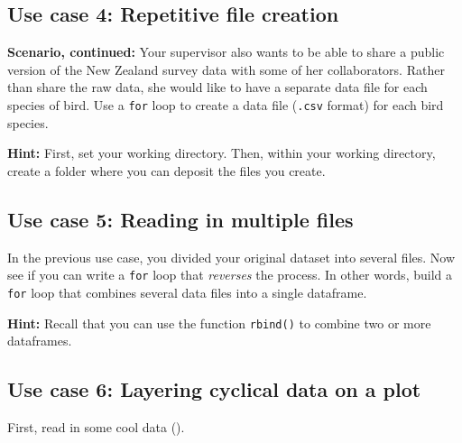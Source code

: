 \documentclass[
]{book}
\begin{document}
\hypertarget{use-case-4-repetitive-file-creation}{%
\subsection*{Use case 4: Repetitive file creation}\label{use-case-4-repetitive-file-creation}}

\textbf{Scenario, continued:} Your supervisor also wants to be able to share a public version of the New Zealand survey data with some of her collaborators. Rather than share the raw data, she would like to have a separate data file for each species of bird. Use a \texttt{for} loop to create a data file (\texttt{.csv} format) for each bird species.

\textbf{Hint:} First, set your working directory. Then, within your working directory, create a folder where you can deposit the files you create.

\hypertarget{use-case-5-reading-in-multiple-files}{%
\subsection*{Use case 5: Reading in multiple files}\label{use-case-5-reading-in-multiple-files}}

In the previous use case, you divided your original dataset into several files. Now see if you can write a \texttt{for} loop that \emph{reverses} the process. In other words, build a \texttt{for} loop that combines several data files into a single dataframe.

\textbf{Hint:} Recall that you can use the function \texttt{rbind()} to combine two or more dataframes.

\hypertarget{use-case-6-layering-cyclical-data-on-a-plot}{%
\subsection*{Use case 6: Layering cyclical data on a plot}\label{use-case-6-layering-cyclical-data-on-a-plot}}

First, read in some cool data ().
\end{document}
